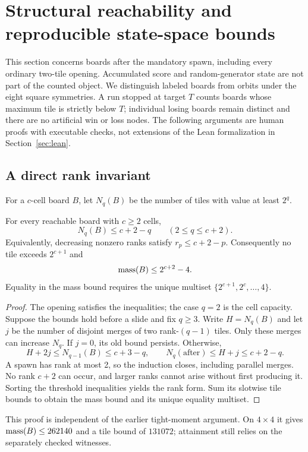 \section{Structural reachability and reproducible state-space bounds}
\label{sec:state-space}

This section concerns boards after the mandatory spawn, including every
ordinary two-tile opening. Accumulated score and random-generator state
are not part of the counted object. We distinguish labeled boards from
orbits under the eight square symmetries. A run stopped at target $T$
counts boards whose maximum tile is strictly below $T$; individual losing
boards remain distinct and there are no artificial win or loss nodes.
The following arguments are human proofs with executable checks, not
extensions of the Lean formalization in Section~\ref{sec:lean}.

\subsection{A direct rank invariant}

For a $c$-cell board $B$, let $N_q(B)$ be the number of tiles with value
at least $2^q$.

\begin{theorem}\label{ss:rank}
For every reachable board with $c\ge2$ cells,
\[
 N_q(B)\le c+2-q\qquad(2\le q\le c+2).
\]
Equivalently, decreasing nonzero ranks satisfy $r_p\le c+2-p$.
Consequently no tile exceeds $2^{c+1}$ and
\[
 \mathrm{mass}(B)\le 2^{c+2}-4.
\]
Equality in the mass bound requires the unique multiset
$\{2^{c+1},2^c,\ldots,4\}$.
\end{theorem}
\begin{proof}
The opening satisfies the inequalities; the case $q=2$ is the cell
capacity. Suppose the bounds hold before a slide and fix $q\ge3$.
Write $H=N_q(B)$ and let $j$ be the number of disjoint merges of two
rank-$(q-1)$ tiles. Only these merges can increase $N_q$.
If $j=0$, its old bound persists. Otherwise,
\[
 H+2j\le N_{q-1}(B)\le c+3-q,
 \qquad N_q(\text{after})\le H+j\le c+2-q.
\]
A spawn has rank at most 2, so the induction closes, including parallel
merges. No rank $c+2$ can occur, and larger ranks cannot arise without
first producing it. Sorting the threshold inequalities yields the rank
form. Sum its slotwise tile bounds to obtain the mass bound and its
unique equality multiset.
\end{proof}

This proof is independent of the earlier tight-moment argument. On
$4\times4$ it gives $\mathrm{mass}(B)\le262140$ and a tile bound of $131072$;
attainment still relies on the separately checked witnesses.

